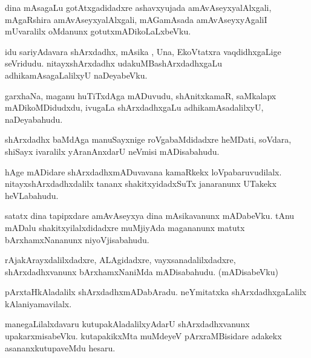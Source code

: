 \documentclass{article}
\begin{document}
\begin{mn}
dina  mAsagaLu  gotAtxgadidadxre  ashavxyujada  amAvAseyxyalAlxgali,  mAgaRshira  amAvAseyxyalAlxgali,  mAGamAsada  amAvAseyxyAgaliI  
mUvaralilx  oMdanunx  gotutxmADikoLaLxbeVku.
\end{mn}

\begin{mn}
idu  sariyAdavara  shArxdadhx,  mAsika ,  Una,  EkoVtatxra  vaqdidhxgaLige  seVridudu.  nitayxshArxdadhx  udakuMBashArxdadhxgaLu  
adhikamAsagaLalilxyU  naDeyabeVku.
\end{mn}

\begin{mn}
garxhaNa,  maganu  huTiTxdAga  mADuvudu,  shAnitxkamaR,  saMkalapx  mADikoMDidudxdu,  ivugaLa  shArxdadhxgaLu  adhikamAsadalilxyU,  naDeyabahudu.
\end{mn}

\begin{mn}
shArxdadhx  baMdAga  manuSayxnige  roVgabaMdidadxre  heMDati,  soVdara,  shiSayx  ivaralilx  yAranAnxdarU  neVmisi  mADisabahudu.
\end{mn}

\begin{mn}
hAge  mADidare  shArxdadhxmADuvavana  kamaRkekx  loVpabaruvudilalx.  nitayxshArxdadhxdalilx  tananx  shakitxyidadxSuTx  janaranunx  
UTakekx  heVLabahudu.
\end{mn}

\begin{mn}
satatx dina  tapipxdare  amAvAseyxya  dina  mAsikavanunx  mADabeVku.  tAnu  mADalu  shakitxyilalxdidadxre  muMjiyAda  magananunx  
matutx  bArxhamxNananunx  niyoVjisabahudu.
\end{mn}

\begin{mn}
rAjakArayxdalilxdadxre,  ALAgidadxre,  vayxsanadalilxdadxre,  shArxdadhxvanunx  bArxhamxNaniMda  mADisabahudu.  (mADisabeVku)
\end{mn}

\begin{mn}
pArxtaHkAladalilx  shArxdadhxmADabAradu.  neYmitatxka  shArxdadhxgaLalilx  kAlaniyamavilalx.
\end{mn}

\begin{mn}
manegaLilalxdavaru  kutupakAladalilxyAdarU  shArxdadhxvanunx  upakarxmisabeVku.  kutapakikxMta  muMdeyeV  pArxraMBisidare  
adakekx  asananxkutupaveMdu  hesaru.
\end{mn}
\end{document}
